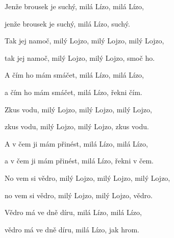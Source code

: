 \zs
Jenže brousek je suchý, milá Lízo, milá Lízo,

jenže brousek je suchý, milá Lízo, suchý.
\ks

\zs
Tak jej namoč, milý Lojzo, milý Lojzo, milý Lojzo,

tak jej namoč, milý Lojzo, milý Lojzo, smoč ho.
\ks

\zs
A čím ho mám smáčet, milá Lízo, milá Lízo,

a čím ho mám smáčet, milá Lízo, řekni čím.
\ks

\zs
Zkus vodu, milý Lojzo, milý Lojzo, milý Lojzo,

zkus vodu, milý Lojzo, milý Lojzo, zkus vodu.
\ks

\zs
A v čem ji mám přinést, milá Lízo, milá Lízo,

a v čem ji mám přinést, milá Lízo, řekni v čem.
\ks

\zs
No vem si vědro, milý Lojzo, milý Lojzo, milý Lojzo,

no vem si vědro, milý Lojzo, milý Lojzo, vědro.
\ks

\zs
Vědro má ve dně díru, milá Lízo, milá Lízo,

vědro má ve dně díru, milá Lízo, jak hrom.
\ks

\kp
